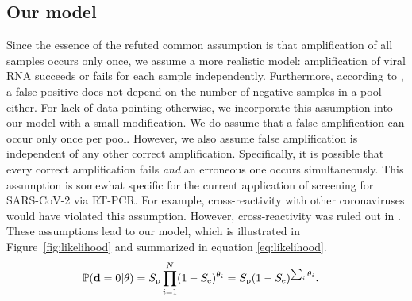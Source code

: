 \documentclass{article}
\begin{document}
\subsection*{Our model}\label{subsec:ours}
Since the essence of the refuted common assumption is that
amplification of all samples occurs only once, we assume a more
realistic model: amplification of viral RNA succeeds or fails for each
sample independently. Furthermore, according to \cite{Simplistic1,
  Simplistic2, Kim, OptimalDorfmanPool}, a false-positive does not
depend on the number of negative samples in a pool either. For lack of
data pointing otherwise, we incorporate this assumption into our model
with a small modification. We do assume that a false amplification can
occur only once per pool. However, we also assume false amplification
is independent of any other correct amplification. Specifically, it is
possible that every correct amplification fails \emph{and} an
erroneous one occurs simultaneously. This assumption is somewhat
specific for the current application of screening for SARS-CoV-2 via
RT-PCR. For example, cross-reactivity with other coronaviruses would
have violated this assumption. However, cross-reactivity was ruled out
in \cite{KitComparison}. These assumptions lead to our model, which is
illustrated in Figure~\ref{fig:likelihood} and summarized in
equation \eqref{eq:likelihood}.
\begin{align}\label{eq:likelihood}
    \mathbb{P}(\mathbf{d}=0 | \theta) &= S_{\text{p}}\prod_{i=1}^N (1-S_{\text{e}})^{\theta_i} =
    S_{\text{p}}(1-S_\text{e})^{\sum_i\theta_i}.
\end{align}
\end{document}
